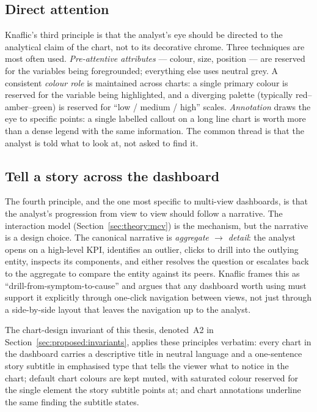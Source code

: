 \subsection{Direct attention}

Knaflic's third principle is that the analyst's eye should be
directed to the analytical claim of the chart, not to its
decorative chrome. Three techniques are most often used.
\emph{Pre-attentive attributes} --- colour, size, position ---
are reserved for the variables being foregrounded; everything
else uses neutral grey. A consistent \emph{colour role} is
maintained across charts: a single primary colour is reserved
for the variable being highlighted, and a diverging palette
(typically red--amber--green) is reserved for ``low / medium /
high'' scales. \emph{Annotation} draws the eye to specific
points: a single labelled callout on a long line chart is
worth more than a dense legend with the same information. The
common thread is that the analyst is told what to look at,
not asked to find it.

\subsection{Tell a story across the dashboard}

The fourth principle, and the one most specific to multi-view
dashboards, is that the analyst's progression from view to
view should follow a narrative. The interaction model
(Section~\ref{sec:theory:mcv}) is the mechanism, but the
narrative is a design choice. The canonical narrative is
\emph{aggregate $\rightarrow$ detail}: the analyst opens on a
high-level KPI, identifies an outlier, clicks to drill into
the outlying entity, inspects its components, and either
resolves the question or escalates back to the aggregate to
compare the entity against its peers. Knaflic frames this as
``drill-from-symptom-to-cause'' and argues that any dashboard
worth using must support it explicitly through one-click
navigation between views, not just through a side-by-side
layout that leaves the navigation up to the analyst.

The chart-design invariant of this thesis, denoted~A2 in
Section~\ref{sec:proposed:invariants}, applies these principles
verbatim: every chart in the dashboard carries a descriptive
title in neutral language and a one-sentence story subtitle in
emphasised type that tells the viewer what to notice in the
chart; default chart colours are kept muted, with saturated
colour reserved for the single element the story subtitle points
at; and chart annotations underline the same finding the subtitle
states.
